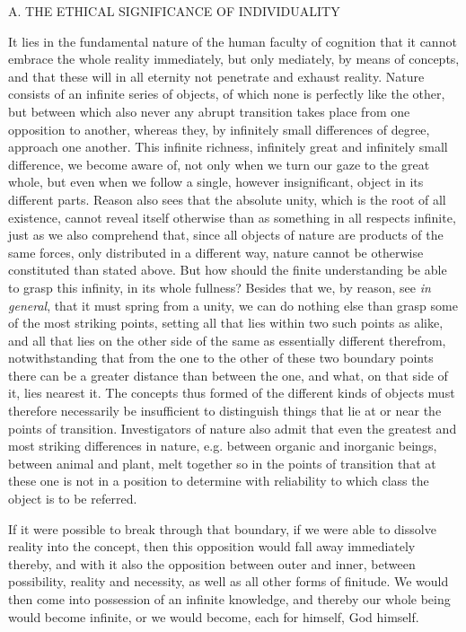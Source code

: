 \documentclass[12pt,a4paper,openany]{book}
\newcommand{\opage}[1]{\marginnote{\footnotesize\textit{[#1]}}}
\newcommand{\excerpthead}[1]{\par\bigskip\begin{center}#1\end{center}\nopagebreak\smallskip}
\begin{document}
\excerpthead{A. THE ETHICAL SIGNIFICANCE OF INDIVIDUALITY}


It lies in the fundamental nature of the human faculty of cognition that it cannot
embrace the whole reality immediately, but only mediately, by means of concepts, and
that these will in all eternity not penetrate and exhaust reality.
\setcounter{footnote}{0}%
\opage{81}Nature consists of an infinite series of objects, of which none is perfectly like
the other, but between which also never any abrupt transition takes place from one
opposition to another, whereas they, by infinitely small differences of degree,
approach one another. This infinite richness, infinitely great and infinitely small
difference, we become aware of, not only when we turn our gaze to the great whole,
but even when we follow a single, however insignificant, object in its different
parts. Reason also sees that the absolute unity, which is the root of all existence,
cannot reveal itself otherwise than as something in all respects infinite, just as
we also comprehend that, since all objects of nature are products of the same
forces, only distributed in a different way, nature cannot be otherwise constituted
than stated above. But how should the finite understanding be able to grasp this
infinity, in its whole fullness? Besides that we, by reason, see \emph{in general},
that it must spring from a unity, we can do nothing else than grasp some of the most
striking points, setting all that lies within two such points as alike, and all that
lies on the other side of the same as essentially different therefrom,
notwithstanding that from the one to the other of these two boundary points there
can be a greater distance than between the one, and what, on that side of it, lies
nearest it. The concepts thus formed of the different kinds of objects must
therefore necessarily be insufficient to distinguish things that lie at or near the
points of transition. Investigators of nature also admit that even the greatest and
most striking differences in nature, e.g. between organic and inorganic beings,
between animal and plant, melt together so in the points of transition that at these
one is not in a position to determine with reliability to which class the object is
to be referred.


If it were possible to break through that boundary,
\setcounter{footnote}{0}%
\opage{82}if we were able to dissolve reality into the concept, then this opposition would
fall away immediately thereby, and with it also the opposition between outer and
inner, between possibility, reality and necessity, as well as all other forms of
finitude. We would then come into possession of an infinite knowledge, and thereby
our whole being would become infinite, or we would become, each for himself, God
himself.
\end{document}
